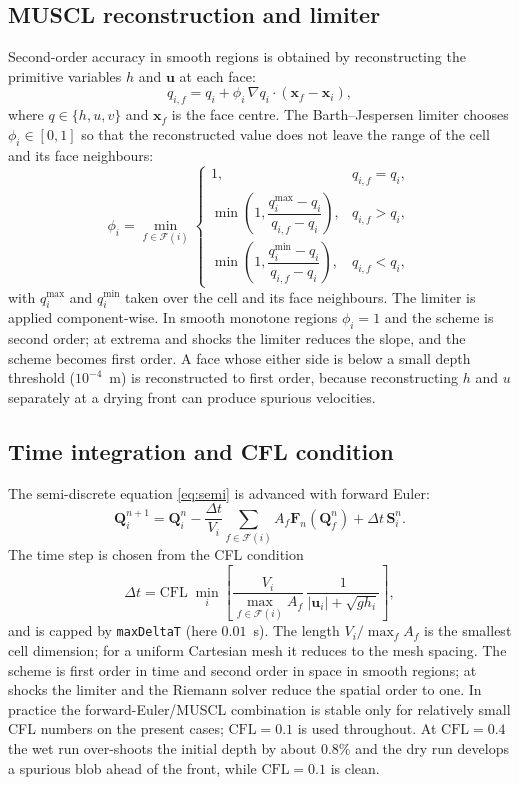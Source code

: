 ﻿\documentclass[11pt,a4paper]{article}
\newcommand{\bu}{\mathbf{u}}
\newcommand{\bx}{\mathbf{x}}
\newcommand{\bF}{\mathbf{F}}
\newcommand{\bQ}{\mathbf{Q}}
\newcommand{\bS}{\mathbf{S}}
\newcommand{\dt}{\Delta t}
\begin{document}
\subsection{MUSCL reconstruction and limiter}
Second-order accuracy in smooth regions is obtained by reconstructing the
primitive variables $h$ and $\bu$ at each face:
\begin{equation}
  q_{i,f}=q_i+\phi_i\,\nabla q_i\cdot(\bx_f-\bx_i),
  \label{eq:muscl}
\end{equation}
where $q\in\{h,u,v\}$ and $\bx_f$ is the face centre.  The Barth--Jespersen
limiter \cite{barth1989} chooses $\phi_i\in[0,1]$ so that the reconstructed
value does not leave the range of the cell and its face neighbours:
\begin{equation}
  \phi_i=\min_{f\in\mathcal{F}(i)}
  \begin{cases}
    1, & q_{i,f}=q_i,\\[2pt]
    \min\left(1,\dfrac{q_i^{\max}-q_i}{q_{i,f}-q_i}\right),
      & q_{i,f}>q_i,\\[8pt]
    \min\left(1,\dfrac{q_i^{\min}-q_i}{q_{i,f}-q_i}\right),
      & q_{i,f}<q_i,
  \end{cases}
  \label{eq:limiter}
\end{equation}
with $q_i^{\max}$ and $q_i^{\min}$ taken over the cell and its face neighbours.
The limiter is applied component-wise.  In smooth monotone regions
$\phi_i=1$ and the scheme is second order; at extrema and shocks the limiter
reduces the slope, and the scheme becomes first order.  A face whose either
side is below a small depth threshold ($10^{-4}$~m) is reconstructed to first
order, because reconstructing $h$ and $u$ separately at a drying front can
produce spurious velocities.

\subsection{Time integration and CFL condition}
The semi-discrete equation \eqref{eq:semi} is advanced with forward Euler:
\begin{equation}
  \bQ_i^{n+1}=\bQ_i^n
  -\frac{\dt}{V_i}\sum_{f\in\mathcal{F}(i)}A_f\bF_n(\bQ_f^n)
  +\dt\,\bS_i^n .
  \label{eq:euler}
\end{equation}
The time step is chosen from the CFL condition
\begin{equation}
  \dt=\mathrm{CFL}\;\min_i
  \left[
    \frac{V_i}{\max_{f\in\mathcal{F}(i)}A_f}\,
    \frac{1}{|\bu_i|+\sqrt{g h_i}}
  \right],
  \label{eq:cfl}
\end{equation}
and is capped by \texttt{maxDeltaT} (here $0.01$~s).  The length
$V_i/\max_f A_f$ is the smallest cell dimension; for a uniform Cartesian mesh
it reduces to the mesh spacing.  The scheme is first order in time and second
order in space in smooth regions; at shocks the limiter and the Riemann solver
reduce the spatial order to one.  In practice the forward-Euler/MUSCL
combination is stable only for relatively small CFL numbers on the present
cases; $\mathrm{CFL}=0.1$ is used throughout.  At $\mathrm{CFL}=0.4$ the wet
run over-shoots the initial depth by about $0.8\%$ and the dry run develops a
spurious blob ahead of the front, while $\mathrm{CFL}=0.1$ is clean.
\end{document}
